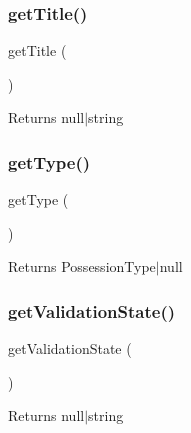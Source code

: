 \subsubsection{\texorpdfstring{getTitle()}{getTitle()}}
{\footnotesize\ttfamily get\+Title (\begin{DoxyParamCaption}{ }\end{DoxyParamCaption})}

\begin{DoxyReturn}{Returns}
null$\vert$string 
\end{DoxyReturn}
\mbox{\label{class_app_1_1_entity_1_1_possession_a830b5c75df72b32396701bc563fbe3c7}} 
\subsubsection{\texorpdfstring{getType()}{getType()}}
{\footnotesize\ttfamily get\+Type (\begin{DoxyParamCaption}{ }\end{DoxyParamCaption})}

\begin{DoxyReturn}{Returns}
Possession\+Type$\vert$null 
\end{DoxyReturn}
\mbox{\label{class_app_1_1_entity_1_1_possession_a7588a9a8519d61108721df413ed38cc9}} 
\subsubsection{\texorpdfstring{getValidationState()}{getValidationState()}}
{\footnotesize\ttfamily get\+Validation\+State (\begin{DoxyParamCaption}{ }\end{DoxyParamCaption})}

\begin{DoxyReturn}{Returns}
null$\vert$string 
\end{DoxyReturn}
\mbox{\label{class_app_1_1_entity_1_1_possession_a57a82c7e2cc6a5009844b8a9a9995e93}} 
